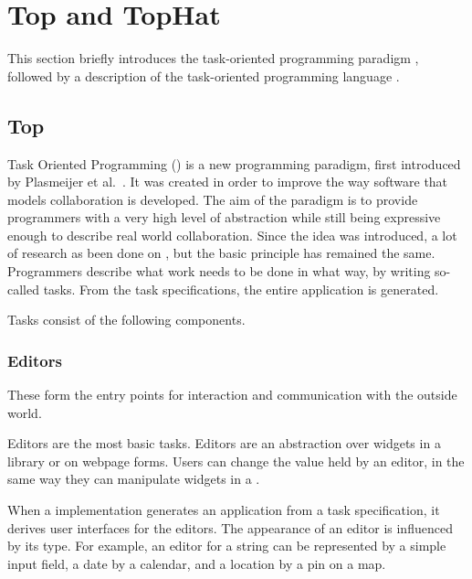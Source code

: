 
\section{Top and TopHat}
\label{sec:tophat}

This section briefly introduces the task-oriented programming paradigm \TOP,
followed by a description of the task-oriented programming language \TOPHAT.


\subsection{Top}

Task Oriented Programming (\TOP) is a  new programming paradigm, first introduced by Plasmeijer et al.~\cite{DBLP:conf/ppdp/PlasmeijerLMAK12}.
It was created in order to improve the way software that models collaboration is developed.
The aim of the paradigm is to provide programmers with a very high level of abstraction while still being expressive enough to describe real world collaboration.
Since the idea was introduced, a lot of research as been done on \TOP, but the basic principle has remained the same.
Programmers describe what work needs to be done in what way, by writing so-called tasks.
From the task specifications, the entire application is generated.


Tasks consist of the following components.


\subsubsection{Editors}

  These form the entry points for interaction and communication with the outside world.

  Editors are the most basic tasks.
  Editors are an abstraction over widgets in a \GUI library or on webpage forms.
  Users can change the value held by an editor, in the same way they can manipulate widgets in a \GUI.

  When a \TOP implementation generates an application from a task specification, it derives user interfaces for the editors.
  The appearance of an editor is influenced by its type.
  For example, an editor for a string can be represented by a simple input field, a date by a calendar, and a location by a pin on a map.


